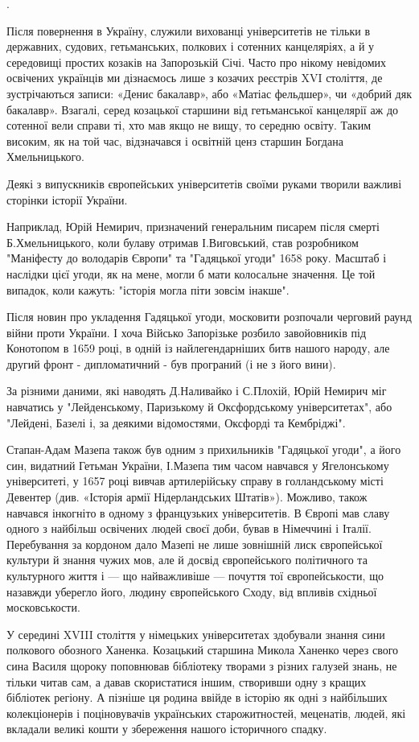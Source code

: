 .

Після повернення в Україну, служили вихованці університетів не тільки в
державних, судових, гетьманських, полкових і сотенних канцеляріях, а й у
середовищі простих козаків на Запорозькій Січі. Часто про нікому невідомих
освічених українців ми дізнаємось лише з козачих реєстрів XVI століття, де
зустрічаються записи: «Денис бакалавр», або «Матіас фельдшер», чи «добрий дяк
бакалавр». Взагалі, серед козацької старшини від гетьманської канцелярії аж до
сотенної вели справи ті, хто мав якщо не вищу, то середню освіту. Таким
високим, як на той час, відзначався і освітній ценз старшин Богдана
Хмельницького.

Деякі з випускників європейських університетів своїми руками творили важливі
сторінки історії України.

Наприклад, Юрій Немирич, призначений генеральним писарем після смерті
Б.Хмельницького, коли булаву отримав І.Виговський, став розробником "Маніфесту
до володарів Європи" та "Гадяцької угоди" 1658 року. Масштаб і наслідки цієї
угоди, як на мене, могли б мати колосальне значення. Це той випадок, коли
кажуть: "історія могла піти зовсім інакше".

Після новин про укладення Гадяцької угоди, московити розпочали черговий раунд
війни проти України. І хоча Військо Запорізьке розбило завойовників під
Конотопом в 1659 році, в одній із найлегендарніших битв нашого народу, але
другий фронт - дипломатичний - був програний (і не з його вини). 

За різними даними, які наводять Д.Наливайко і С.Плохій, Юрій Немирич міг
навчатись у "Лейденському, Паризькому й Оксфордському університетах", або
"Лейдені, Базелі і, за деякими відомостями, Оксфорді та Кембріджі".

Стапан-Адам Мазепа також був одним з прихильників "Гадяцької угоди", а його
син, видатний Гетьман України, І.Мазепа тим часом навчався у Ягелонському
університеті, у 1657 році вивчав артилерійську справу в голландському місті
Девентер (див. «Історія армії Нідерландських Штатів»). Можливо, також навчався
інкогніто в одному з французьких університетів. В Європі мав славу одного з
найбільш освічених людей своєї доби, бував в Німеччині і Італії. Перебування за
кордоном дало Мазепі не лише зовнішній лиск європейської культури й знання
чужих мов, але й досвід європейського політичного та культурного життя і — що
найважливіше — почуття тої європейськости, що назавжди уберегло його, людину
європейського Сходу, від впливів східньої московськости.

У середині XVIII століття у німецьких університетах здобували знання сини
полкового обозного Ханенка. Козацький старшина Микола Ханенко через свого сина
Василя щороку поповнював бібліотеку творами з різних галузей знань, не тільки
читав сам, а давав скористатися іншим, створивши одну з кращих бібліотек
регіону. А пізніше ця родина ввійде в історію як одні з найбільших
колекціонерів і поціновувачів українських старожитностей, меценатів, людей, які
вкладали великі кошти у збереження нашого історичного спадку.

